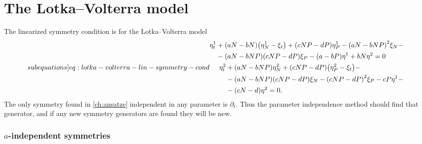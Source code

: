\section{The Lotka--Volterra model}

The linearized symmetry condition  is for the Lotka--Volterra model
\begin{subequations} \label[subequations]{eq:lotka-volterra-lin-symmetry-cond}
  \begin{align}
    \begin{split}
      \eta^1_t &+ \left(a N - b N\right) \left(\eta^1_{N} - \xi_t\right) + \left(c N P - d P\right) \eta^1_{P} - \left(a N - b N P\right)^2 \xi_{N} -\\
      &- \left(a N - b N P\right) \left(c N P - d P\right) \xi_{P} - \left(a - b P\right) \eta^1 + b N \eta^2 = 0
    \end{split}\\
    \begin{split}
      \eta^2_t &+ \left(a N - b N P\right) \eta^2_{N} + \left(c N P - d P\right) \left(\eta^2_{P} - \xi_t\right) -\\
      &- \left(a N - b N P\right) \left(c N P - d P\right) \xi_{N} - \left(c N P - d P\right)^2 \xi_{P} - c P \eta^1 -\\
      &- \left(c N - d\right) \eta^2 = 0.
    \end{split}
  \end{align}
\end{subequations}
The only symmetry found in \cref{ch:ansatze} independent in any parameter is \(\partial_t\).
Thus the parameter independence method should find that generator, and if any new symmetry generators are found they will be new.

\subsubsection{\texorpdfstring{\(a\)-independent symmetries}{a-independent symmetries}}

